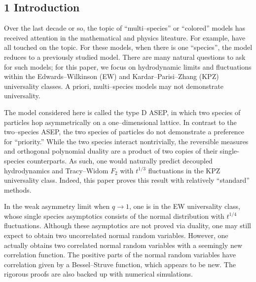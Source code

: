 \documentclass[11pt]{article}
\theoremstyle{plain}
\theoremstyle{definition}
\theoremstyle{remark}
\begin{document}
{\small\tableofcontents}

\subsection{1 Introduction}\label{sec_intro}

Over the last decade or so, the topic of ``multi--species'' or ``colored'' models has received attention in the mathematical and physics liteature. For example,    \cite{Spohn14, FSS, PSSS, SpohnStoltz, PSS, MendlSpohn, vanBeijeren, DDSMS, SpohnReview, FunakiHoshino, KupiainenMarcozzi, ButelmannMF,
  CdGHSU, NejjarMixing, FerrariNejjar, NejjarHard, ACH, BalazsSeppalainen, FerrariMartin, ANP, BorodinWheeler, AggarwalBorodin, FerrariKipnis,
  CasiniGR, FKZ, CGMO, KuanZhou, GroeneveltWagenaar, Wagenaar, AyalaZimmer, DaCunhaSasada, CCGO, CasiniFG, dNBD, Doyon, DPSY, DEHP,
  CorteelWilliams, CdGW, KMO, Martin, RDKKS, SKP, WCS} have all touched on the topic. For these models, when there is one ``species'', the model reduces to a previously studied model. There are many natural questions to ask for such models; for this paper, we focus on hydrodynamic limits and fluctuations within the Edwards--Wilkinson (EW) and Kardar--Parisi--Zhang (KPZ) universality classes. A priori, multi--species models may not demonstrate universality. 
  
  The model considered here is called the type D ASEP, in which two species of particles hop asymmetrically on a one--dimensional lattice. In contrast to the two--species ASEP, the two species of particles do not demonstrate a preference for ``priority.'' While the two species interact nontrivially, the reversible measures and orthogonal polynomial duality are a product of two copies of their single-species counterparts.  As such, one would naturally predict decoupled hydrodynamics and Tracy--Widom $F_2$ with $t^{1/3}$ fluctuations in the KPZ universality class. Indeed, this paper proves this result with relatively ``standard'' methods. 
  
 In the weak asymmetry limit when $q\rightarrow 1$, one is in the EW universality class, whose single species asymptotics consists of the normal distribution with $t^{1/4}$ fluctuations. Although these asymptotics are not proved via duality, one may still expect to obtain two uncorrelated normal random variables. However, one actually obtains two correlated normal random variables with a seemingly new correlation function. The positive parts of the normal random variables have correlation given by a Bessel--Struve function, which appears to be new. The rigorous proofs are also backed up with numerical simulations.
  
\end{document}
